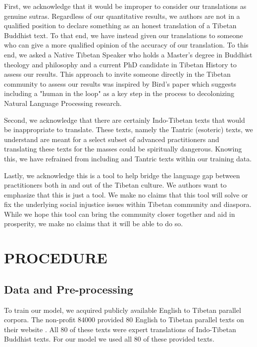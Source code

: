 \documentclass[letterpaper, 12 pt, conference]{ieeeconf}  %
\begin{document}
First, we acknowledge that it would be improper to consider our translations as genuine sutras. Regardless of our quantitative results, we authors are not in a qualified position to declare something as an honest translation of a Tibetan Buddhist text. To that end, we have instead given our translations to someone who can give a more qualified opinion of the accuracy of our translation. To this end, we asked a Native Tibetan Speaker who holds a Master's degree in Buddhist theology and philosophy and a current PhD candidate in Tibetan History to  assess our results. This approach to invite someone directly in the Tibetan community to assess our results was inspired by Bird's paper \cite{c7} which suggests including a "human in the loop" as a key step in the process to decolonizing Natural Language Processing research. 

Second, we acknowledge that there are certainly Indo-Tibetan texts that would be inappropriate to translate. These texts, namely the Tantric (esoteric) texts, we understand are meant for a select subset of advanced practitioners and translating these texts for the masses could be spiritually dangerous. Knowing this, we have refrained from including and Tantric texts within our training data. 

Lastly, we acknowledge this is a tool to help bridge the language gap between practitioners both in and out of the Tibetan culture. We authors want to emphasize that this is just a tool. We make no claims that this tool will solve or fix the underlying social injustice issues within Tibetan community and diaspora. While we hope this tool can bring the community closer together and aid in prosperity, we make no claims that it will be able to do so. 

\section{PROCEDURE}


\subsection{Data and Pre-processing}

To train our model, we acquired publicly available English to Tibetan parallel corpora. The non-profit 84000 provided 80 English to Tibetan parallel texts on their website \cite{c8}. All 80 of these texts were expert translations of Indo-Tibetan Buddhist texts. For our model we used all 80 of these provided texts.
\end{document}
